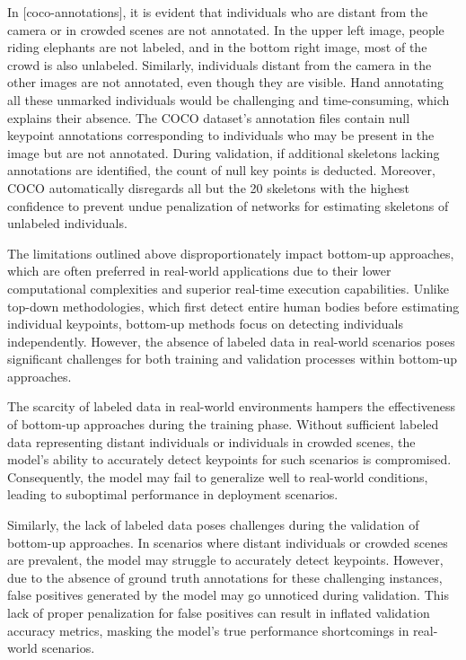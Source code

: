 
In [coco-annotations], it is evident that individuals who are distant from the camera or in crowded scenes are not annotated. In the upper left image, people riding elephants are not labeled, and in the bottom right image, most of the crowd is also unlabeled. Similarly, individuals distant from the camera in the other images are not annotated, even though they are visible. Hand annotating all these unmarked individuals would be challenging and time-consuming, which explains their absence. The COCO dataset's annotation files contain null keypoint annotations corresponding to individuals who may be present in the image but are not annotated. During validation, if additional skeletons lacking annotations are identified, the count of null key points is deducted. Moreover, COCO automatically disregards all but the 20 skeletons with the highest confidence to prevent undue penalization of networks for estimating skeletons of unlabeled individuals.

The limitations outlined above disproportionately impact bottom-up approaches, which are often preferred in real-world applications due to their lower computational complexities and superior real-time execution capabilities. Unlike top-down methodologies, which first detect entire human bodies before estimating individual keypoints, bottom-up methods focus on detecting individuals independently. However, the absence of labeled data in real-world scenarios poses significant challenges for both training and validation processes within bottom-up approaches.

The scarcity of labeled data in real-world environments hampers the effectiveness of bottom-up approaches during the training phase. Without sufficient labeled data representing distant individuals or individuals in crowded scenes, the model's ability to accurately detect keypoints for such scenarios is compromised. Consequently, the model may fail to generalize well to real-world conditions, leading to suboptimal performance in deployment scenarios.

Similarly, the lack of labeled data poses challenges during the validation of bottom-up approaches. In scenarios where distant individuals or crowded scenes are prevalent, the model may struggle to accurately detect keypoints. However, due to the absence of ground truth annotations for these challenging instances, false positives generated by the model may go unnoticed during validation. This lack of proper penalization for false positives can result in inflated validation accuracy metrics, masking the model's true performance shortcomings in real-world scenarios.

